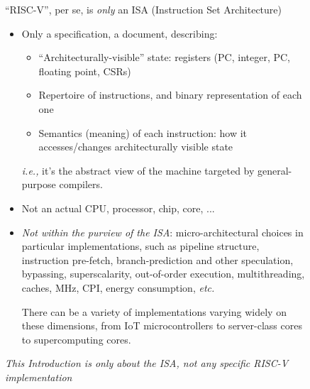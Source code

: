 \documentclass{article}
\newcommand{\ie}{\emph{i.e.,}}
\newcommand{\etc}{\emph{etc.}}
\begin{document}
\clearpage


\begin{figure}[htp]
    \centering
    {\Huge ``RISC-V'', per se, is \emph{only} an ISA (Instruction Set Architecture)}

    \vspace{0.5in}

    \begin{minipage}{9in}\LARGE
      \begin{itemize}
      \item Only a specification, a document, describing:
        \begin{itemize}
        \item ``Architecturally-visible'' state: registers (PC, integer, PC, floating point, CSRs)
        \item Repertoire of instructions, and binary representation of each one
        \item Semantics (meaning) of each instruction: how it
          accesses/changes architecturally visible state
        \end{itemize}
        {\ie} it's the abstract view of the machine targeted by general-purpose compilers.

      \item Not an actual CPU, processor, chip, core, ...

      \item \emph{Not within the purview of the ISA}:
        micro-architectural choices in particular implementations,
        such as pipeline structure, instruction pre-fetch,
        branch-prediction and other speculation, bypassing,
        superscalarity, out-of-order execution, multithreading,
        caches, MHz, CPI, energy consumption, {\etc}

        There can be a variety of implementations varying widely on
        these dimensions, from IoT microcontrollers to server-class
        cores to supercomputing cores.
      \end{itemize}

      \vspace{0.5in}

      \begin{center}
        \emph{This Introduction is \emph{only} about the ISA, not any specific RISC-V implementation}
      \end{center}
    \end{minipage}
\end{figure}
\end{document}
